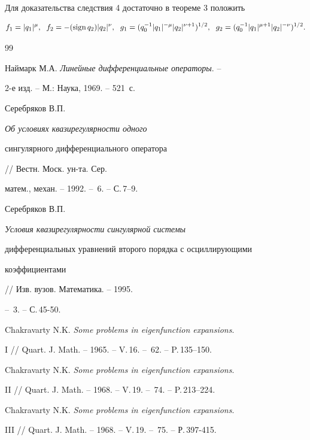  


Для доказательства следствия 4 достаточно в теореме 3 положить 


$$ 


f_1=|q_1|^\mu,\ \; f_2=-(\text{sign\,}q_2)|q_2|^\nu, 


\ \; g_1=(q^{-1}_0|q_1|^{-\mu}|q_2|^{\nu+1})^{1/2}, 


\ \; g_2=(q^{-1}_0|q_1|^{\mu+1}|q_2|^{-\nu})^{1/2}. 


$$ 


 


\begin{thebibliography}{99} 


 




Наймарк М.А. {\em Линейные дифференциальные операторы}. -- 


2-е изд. -- М.: Наука, 1969. -- 521~с. 




Серебряков В.П. {\em Об условиях квазирегулярности одного 


сингулярного дифференциального оператора} // Вестн. Моск. ун-та. Сер. 


матем., механ. -- 1992. -- \No\,6. -- С.\,7--9. 




Серебряков В.П. {\em Условия квазирегулярности сингулярной системы 


дифференциальных уравнений второго порядка с осциллирующими 


коэффициентами} // Изв. вузов. Математика. -- 1995. 


-- \No\,3. -- С.\,45-50. 




Chakravarty N.K. {\em Some problems in eigenfunction expansions}. 


I // Quart. J. Math. -- 1965. -- V.\,16. -- \No\,62. -- P.\,135--150. 




Chakravarty N.K. {\em Some problems in eigenfunction expansions}. 


II // Quart. J. Math. -- 1968. -- V.\,19. -- \No\,74. -- P.\,213--224. 




Chakravarty N.K. {\em Some problems in eigenfunction expansions}. 


III // Quart. J. Math. -- 1968. -- V.\,19. -- \No\,75. -- Р.\,397-415. 



\end{thebibliography}

